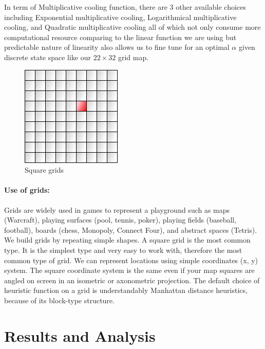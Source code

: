 \documentclass[a4paper]{article}
\begin{document}
In term of Multiplicative cooling function, there are 3 other available choices including Exponential multiplicative cooling, Logarithmical multiplicative cooling, and Quadratic multiplicative cooling all of which not only consume more computational resource comparing to the linear function we are using but predictable nature of linearity also allows us to fine tune for an optimal $\alpha$ given discrete state space like our $22 \times 32$ grid map. \\

\begin{figure}[h!]
  \centering
    \includegraphics[scale=.6]{images/square-grid.png}
  \caption{Square grids}
\end{figure}

\paragraph{Use of grids:} Grids are widely used in games to represent a playground such as maps (Warcraft), playing surfaces (pool, tennis, poker), playing fields (baseball, football), boards (chess, Monopoly, Connect Four), and abstract spaces (Tetris). \\

We build grids by repeating simple shapes. A square grid is the most common type. It is the simplest type and very easy to work with, therefore the most common type of grid. We can represent locations using simple coordinates (x, y) system. The square coordinate system is the same even if your map squares are angled on screen in an isometric or axonometric projection. The default choice of heuristic function on a grid is understandably Manhattan distance heuristics, because of its block-type structure.


\section{Results and Analysis}
\end{document}
